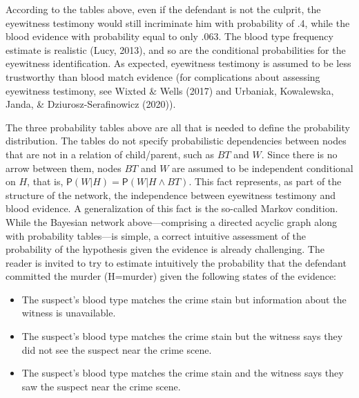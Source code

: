 \documentclass[11pt,dvipsnames,enabledeprecatedfontcommands]{scrartcl}
\newcommand{\pr}[1]{\mathsf{P}(#1)}
\begin{document}
\vspace{2mm}

\noindent
According to the tables above, even if the defendant is not the culprit,
the eyewitness testimony would still incriminate him with probability of
.4, while the blood evidence with probability equal to only .063. The
blood type frequency estimate is realistic (Lucy, 2013), and so are the
conditional probabilities for the eyewitness identification. As
expected, eyewitness testimony is assumed to be less trustworthy than
blood match evidence (for complications about assessing eyewitness
testimony, see Wixted \& Wells (2017) and Urbaniak, Kowalewska, Janda,
\& Dziurosz-Serafinowicz (2020)).

The three probability tables above are all that is needed to define the
probability distribution. The tables do not specify probabilistic
dependencies between nodes that are not in a relation of child/parent,
such as \(BT\) and \(W\). Since there is no arrow between them, nodes
\(BT\) and \(W\) are assumed to be independent conditional on \(H\),
that is, \(\pr{W \vert H}=\pr{W \vert H \wedge BT}\). This fact
represents, as part of the structure of the network, the independence
between eyewitness testimony and blood evidence. A generalization of
this fact is the so-called Markov condition. While the Bayesian network
above---comprising a directed acyclic graph along with probability
tables---is simple, a correct intuitive assessment of the probability of
the hypothesis given the evidence is already challenging. The reader is
invited to try to estimate intuitively the probability that the
defendant committed the murder (H=murder) given the following states of
the evidence:

\begin{itemize} 
\item The suspect's blood type matches the crime stain but  information about the witness is unavailable.
\item The suspect's blood type matches the crime stain but the witness says they did not see the suspect near the crime scene.
\item The suspect's blood type matches the crime stain and the witness says they saw the suspect near the crime scene.
\end{itemize}

\noindent
\end{document}
